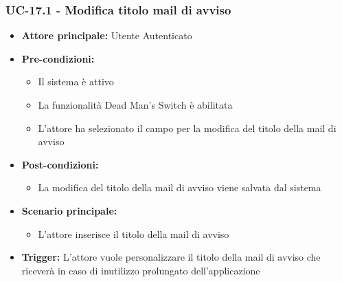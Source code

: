 \documentclass[a4paper,12pt]{article}
\begin{document}
\subsubsection{UC-17.1 - Modifica titolo mail di avviso} \label{sec:UC-17.1}
\begin{itemize}
    \item \textbf{Attore principale:} Utente Autenticato
    \item \textbf{Pre-condizioni:}
    \begin{itemize}
        \item Il sistema è attivo
        \item La funzionalità Dead Man's Switch è abilitata
        \item L'attore ha selezionato il campo per la modifica del titolo della mail di avviso
    \end{itemize}
    \item \textbf{Post-condizioni:}
    \begin{itemize}
        \item La modifica del titolo della mail di avviso viene salvata dal sistema
    \end{itemize}
    \item \textbf{Scenario principale:} 
    \begin{itemize}
        \item L'attore inserisce il titolo della mail di avviso
    \end{itemize}
    \item \textbf{Trigger:} L'attore vuole personalizzare il titolo della mail di avviso che riceverà in caso di inutilizzo prolungato dell'applicazione
\end{itemize}
\end{document}
